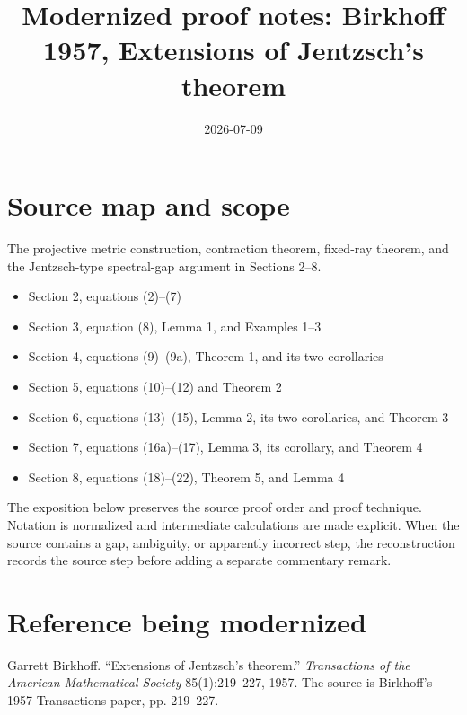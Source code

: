 \documentclass[11pt]{article}
\title{Modernized proof notes: Birkhoff 1957, Extensions of Jentzsch's theorem}
\author{}
\date{2026-07-09}
\begin{document}
\maketitle

\section*{Source map and scope}
\begin{sloppypar}
\begin{description}[style=nextline,leftmargin=3.2cm,labelwidth=3cm]
\item[Primary source] 
\item[Coverage] The projective metric construction, contraction theorem, fixed-ray theorem, and the Jentzsch-type spectral-gap argument in Sections 2--8.
\item[Source anchors]
\begin{itemize}[leftmargin=2em]
  \item Section 2, equations (2)--(7)
  \item Section 3, equation (8), Lemma 1, and Examples 1--3
  \item Section 4, equations (9)--(9a), Theorem 1, and its two corollaries
  \item Section 5, equations (10)--(12) and Theorem 2
  \item Section 6, equations (13)--(15), Lemma 2, its two corollaries, and Theorem 3
  \item Section 7, equations (16a)--(17), Lemma 3, its corollary, and Theorem 4
  \item Section 8, equations (18)--(22), Theorem 5, and Lemma 4
\end{itemize}
\end{description}
\end{sloppypar}

The exposition below preserves the source proof order and proof technique.  Notation is normalized
and intermediate calculations are made explicit.  When the source contains a gap, ambiguity, or
apparently incorrect step, the reconstruction records the source step before adding a separate
commentary remark.

\section*{Reference being modernized}
Garrett Birkhoff. ``Extensions of Jentzsch's theorem.'' \emph{Transactions of the American Mathematical Society} 85(1):219--227, 1957.
The source is Birkhoff's 1957 Transactions paper, pp. 219--227.
\end{document}

